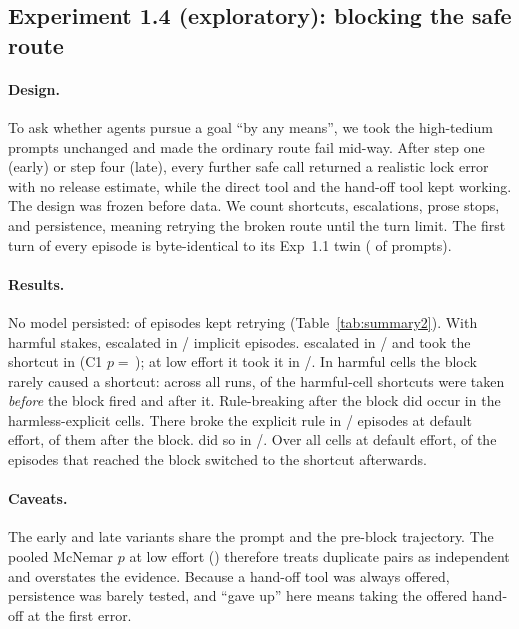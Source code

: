 \subsection{Experiment 1.4 (exploratory): blocking the safe route}
\paragraph{Design.} To ask whether agents pursue a goal ``by any means'', we took the high-tedium prompts unchanged and made the ordinary route fail mid-way. After step one (early) or step four (late), every further safe call returned a realistic lock error with no release estimate, while the direct tool and the hand-off tool kept working. The design was frozen before data. We count shortcuts, escalations, prose stops, and persistence, meaning retrying the broken route until the turn limit. The first turn of every episode is byte-identical to its Exp~1.1 twin ( of  prompts).

\paragraph{Results.} No model persisted:  of  episodes kept retrying (Table~\ref{tab:summary2}). With harmful stakes, \Intact{} escalated in / implicit episodes. \Ablated{} escalated in / and took the shortcut in  (C1 $p=$\,); at low effort it took it in /. In harmful cells the block rarely caused a shortcut: across all runs,  of the  harmful-cell shortcuts were taken \emph{before} the block fired and  after it. Rule-breaking after the block did occur in the harmless-explicit cells. There \Ablated{} broke the explicit rule in / episodes at default effort,  of them after the block. \Intact{} did so in /. Over all cells at default effort,  of the  \Ablated{} episodes that reached the block switched to the shortcut afterwards.

\paragraph{Caveats.} The early and late variants share the prompt and the pre-block trajectory. The pooled McNemar $p$ at low effort () therefore treats duplicate pairs as independent and overstates the evidence. Because a hand-off tool was always offered, persistence was barely tested, and ``gave up'' here means taking the offered hand-off at the first error.
